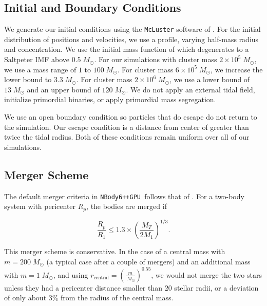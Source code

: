\documentclass[preprint1]{aastex}
\newcommand\Msun{\; M_\odot}
\newcommand\nbody{\texttt{NBody6++GPU }}
\numberwithin{equation}{section}
\begin{document}
\subsection{Initial and Boundary Conditions}
We generate our initial conditions using the \texttt{McLuster} software of \citet{2011Kupper}. For the initial distribution of positions and velocities, we use a \citet{1966King} profile, varying half-mass radius and concentration.  We use the initial mass function of \citet{2001Kroupa} which degenerates to a Saltpeter IMF above $0.5 \Msun$.  For our simulations with cluster mass $2 \times 10^5 \Msun$, we use a mass range of $1$ to $100 \Msun$.  For cluster mass $6 \times 10^5 \Msun$, we increase the lower bound to $3.3 \Msun$.  For cluster mass $2 \times 10^6 \Msun$, we use a lower bound of $13 \Msun$ and an upper bound of $120 \Msun$.  We do not apply an external tidal field, initialize primordial binaries, or apply primordial mass segregation. 

We use an open boundary condition so particles that do escape do not return to the simulation. Our escape condition is a distance from center of greater than twice the tidal radius. Both of these conditions remain uniform over all of our simulations.

\subsection{Merger Scheme}
The default merger criteria in \nbody follows that of \citet{1992Kochanek}.  For a two-body system with pericenter $R_p$, the bodies are merged if

\begin{equation}
 \frac{R_{p}}{R_{1}} \leq 1.3 \times (\frac{M_T}{2M_1})^{1/3}.
 \label{eqn:kochanekcriteria}
\end{equation}

This merger scheme is conservative.  In the case of a central mass with $m = 200 \Msun$ (a typical case after a couple of mergers) and an additional mass with $m = 1 \Msun$, and using $r_{\mathrm{central}} = (\frac{m}{\Msun})^{0.55}$, we would not merge the two stars unless they had a pericenter distance smaller than $20$ stellar radii, or a deviation of only about $3\%$ from the radius of the central mass.
\end{document}
